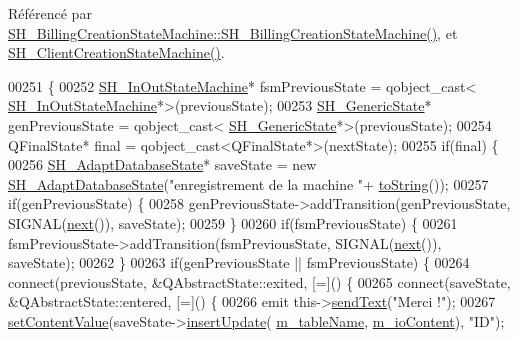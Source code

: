 Référencé par \hyperlink{classSH__BillingCreationStateMachine_ad62b77fa4aeafe200056ff3974562f83}{S\-H\-\_\-\-Billing\-Creation\-State\-Machine\-::\-S\-H\-\_\-\-Billing\-Creation\-State\-Machine()}, et \hyperlink{classSH__ClientCreationStateMachine_a0b406b0f404c0fd33bf35be8ce0cc811}{S\-H\-\_\-\-Client\-Creation\-State\-Machine()}.


\begin{DoxyCode}
00251 \{
00252     \hyperlink{classSH__InOutStateMachine}{SH\_InOutStateMachine}* fsmPreviousState = qobject\_cast<
      \hyperlink{classSH__InOutStateMachine}{SH\_InOutStateMachine}*>(previousState);
00253     \hyperlink{classSH__GenericState}{SH\_GenericState}* genPreviousState = qobject\_cast<
      \hyperlink{classSH__GenericState}{SH\_GenericState}*>(previousState);
00254     QFinalState* \textcolor{keyword}{final} = qobject\_cast<QFinalState*>(nextState);
00255     \textcolor{keywordflow}{if}(\textcolor{keyword}{final}) \{
00256         \hyperlink{classSH__AdaptDatabaseState}{SH\_AdaptDatabaseState}* saveState = \textcolor{keyword}{new} 
      \hyperlink{classSH__AdaptDatabaseState}{SH\_AdaptDatabaseState}(\textcolor{stringliteral}{"enregistrement de la machine "}+
      \hyperlink{classSH__InOutStateMachine_a60ecd7de03d948e2d1e9cbedb5c3e5fa}{toString}());
00257         \textcolor{keywordflow}{if}(genPreviousState) \{
00258             genPreviousState->addTransition(genPreviousState, SIGNAL(\hyperlink{classSH__InOutStateMachine_aa9ee51efe0e17dcf5366c8a97b523892}{next}()), saveState);
00259         \}
00260         \textcolor{keywordflow}{if}(fsmPreviousState) \{
00261             fsmPreviousState->addTransition(fsmPreviousState, SIGNAL(\hyperlink{classSH__InOutStateMachine_aa9ee51efe0e17dcf5366c8a97b523892}{next}()), saveState);
00262         \}
00263         \textcolor{keywordflow}{if}(genPreviousState || fsmPreviousState) \{
00264             connect(previousState, &QAbstractState::exited, [=]() \{
00265                 connect(saveState, &QAbstractState::entered, [=]() \{
00266                     emit this->\hyperlink{classSH__InOutStateMachine_ae2cbbe3cd207158668dcb4838938c7ad}{sendText}(\textcolor{stringliteral}{"Merci !"});
00267                     \hyperlink{classSH__InOutStateMachine_aa2766b7a7ba39c35a10df7fc0c151b4f}{setContentValue}(saveState->\hyperlink{classSH__AdaptDatabaseState_ab010e64da052db416328d3bcb9ca01d4}{insertUpdate}(
      \hyperlink{classSH__InOutStateMachine_acc0f5d5133af2dcca30939f53ec8837b}{m\_tableName}, \hyperlink{classSH__InOutStateMachine_a661a1c7bd3b1086b3b5cd60ca957ecbd}{m\_ioContent}), \textcolor{stringliteral}{"ID"});

\end{DoxyCode}
